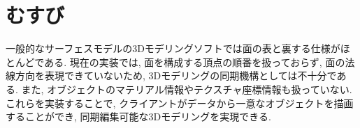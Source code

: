 \chapter{むすび} \label{chap:conclusion}
一般的なサーフェスモデルの3Dモデリングソフトでは面の表と裏する仕様がほとんどである.
現在の実装では, 面を構成する頂点の順番を扱っておらず, 面の法線方向を表現できていないため, 3Dモデリングの同期機構としては不十分である. また, オブジェクトのマテリアル情報やテクスチャ座標情報も扱っていない.
これらを実装することで, クライアントがデータから一意なオブジェクトを描画することができ, 同期編集可能な3Dモデリングを実現できる.
